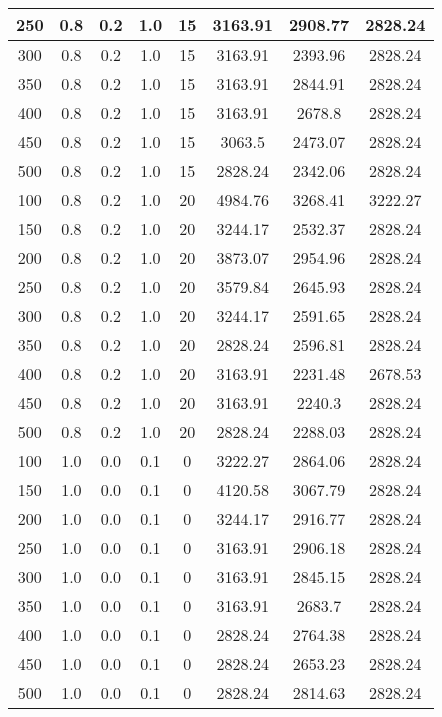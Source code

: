 \documentclass[a4paper, 12pt]{extreport}
\begin{document}
\begin{itemize}
\begin{longtable}{|c|c|c|c|c|c|c|c|}
			250 & 0.8 & 0.2 & 1.0 & 15 & 3163.91 & 2908.77 & 2828.24 \\\hline
			300 & 0.8 & 0.2 & 1.0 & 15 & 3163.91 & 2393.96 & 2828.24 \\\hline
			350 & 0.8 & 0.2 & 1.0 & 15 & 3163.91 & 2844.91 & 2828.24 \\\hline
			400 & 0.8 & 0.2 & 1.0 & 15 & 3163.91 & 2678.8 & 2828.24 \\\hline
			450 & 0.8 & 0.2 & 1.0 & 15 & 3063.5 & 2473.07 & 2828.24 \\\hline
			500 & 0.8 & 0.2 & 1.0 & 15 & 2828.24 & 2342.06 & 2828.24 \\\hline
			100 & 0.8 & 0.2 & 1.0 & 20 & 4984.76 & 3268.41 & 3222.27 \\\hline
			150 & 0.8 & 0.2 & 1.0 & 20 & 3244.17 & 2532.37 & 2828.24 \\\hline
			200 & 0.8 & 0.2 & 1.0 & 20 & 3873.07 & 2954.96 & 2828.24 \\\hline
			250 & 0.8 & 0.2 & 1.0 & 20 & 3579.84 & 2645.93 & 2828.24 \\\hline
			300 & 0.8 & 0.2 & 1.0 & 20 & 3244.17 & 2591.65 & 2828.24 \\\hline
			350 & 0.8 & 0.2 & 1.0 & 20 & 2828.24 & 2596.81 & 2828.24 \\\hline
			400 & 0.8 & 0.2 & 1.0 & 20 & 3163.91 & 2231.48 & 2678.53 \\\hline
			450 & 0.8 & 0.2 & 1.0 & 20 & 3163.91 & 2240.3 & 2828.24 \\\hline
			500 & 0.8 & 0.2 & 1.0 & 20 & 2828.24 & 2288.03 & 2828.24 \\\hline
			100 & 1.0 & 0.0 & 0.1 & 0 & 3222.27 & 2864.06 & 2828.24 \\\hline
			150 & 1.0 & 0.0 & 0.1 & 0 & 4120.58 & 3067.79 & 2828.24 \\\hline
			200 & 1.0 & 0.0 & 0.1 & 0 & 3244.17 & 2916.77 & 2828.24 \\\hline
			250 & 1.0 & 0.0 & 0.1 & 0 & 3163.91 & 2906.18 & 2828.24 \\\hline
			300 & 1.0 & 0.0 & 0.1 & 0 & 3163.91 & 2845.15 & 2828.24 \\\hline
			350 & 1.0 & 0.0 & 0.1 & 0 & 3163.91 & 2683.7 & 2828.24 \\\hline
			400 & 1.0 & 0.0 & 0.1 & 0 & 2828.24 & 2764.38 & 2828.24 \\\hline
			450 & 1.0 & 0.0 & 0.1 & 0 & 2828.24 & 2653.23 & 2828.24 \\\hline
			500 & 1.0 & 0.0 & 0.1 & 0 & 2828.24 & 2814.63 & 2828.24 \\\hline

\end{longtable}
\end{itemize}
\end{document}
